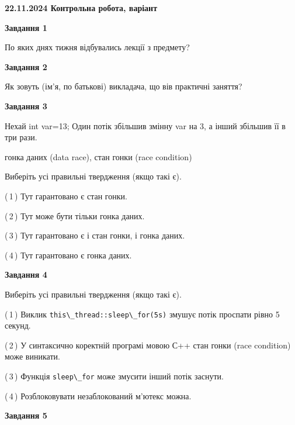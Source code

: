 \documentclass[12pt, ukrainian]{article}
\def\code#1{\Verb!#1!}
\begin{document}
\begin {large}

\textbf{22.11.2024 Контрольна робота, варіант  }\par


{

\begin{center}
\textbf{Завдання 1}
\end{center}

По яких днях тижня відбувались лекції з предмету?


\begin{center}
\textbf{Завдання 2}
\end{center}

Як зовуть (ім'я, по батькові) викладача, що вів практичні заняття?


\begin{center}
\textbf{Завдання 3}
\end{center}

Нехай int var=13; Один потік збільшив змінну var на 3, а інший збільшив її в три рази.

гонка даних (data race), стан гонки (race condition)

Виберіть усі правильні твердження (якщо такі є).\par
\vspace{2mm}
(\,1\,) Тут гарантовано є стан гонки.%

(\,2\,) Тут може бути тільки гонка даних.%

(\,3\,) Тут гарантовано є і стан гонки, і гонка даних.%

(\,4\,) Тут гарантовано є гонка даних.%


\begin{center}
\textbf{Завдання 4}
\end{center}

Виберіть усі правильні твердження (якщо такі є).\par
\vspace{2mm}

(\,1\,) Виклик \code{this\_thread::sleep\_for(5s)} змушує потік проспати рівно 5 секунд.%

(\,2\,) У синтаксично коректній програмі мовою С++ стан гонки (race condition) може виникати.%

(\,3\,) Функція \code{sleep\_for} може змусити інший потік заснути.%

(\,4\,) Розблоковувати незаблокований м’ютекс можна.%


\begin{center}
\textbf{Завдання 5}
\end{center}

}
\end{large}
\end{document}
